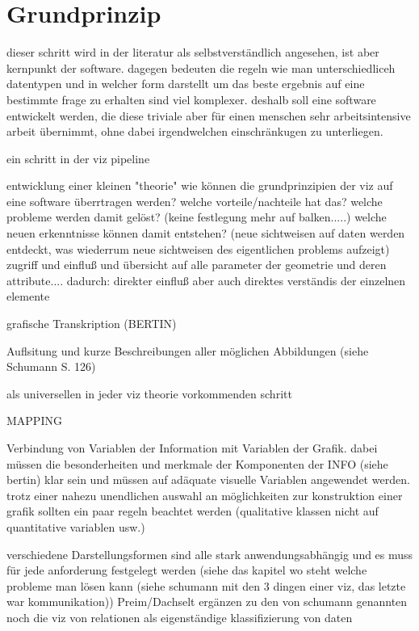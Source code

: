 \documentclass[a4paper, 12pt, DIVcalc, onepage, pdftex, headsepline, footsepline]{scrreprt}
\begin{document}
\section{Grundprinzip}
\label{sec:Grundprinzip}
dieser schritt wird in der literatur als selbstverständlich angesehen, ist aber kernpunkt der software. dagegen bedeuten die regeln wie man unterschiedliceh datentypen und in welcher form darstellt um das beste ergebnis auf eine bestimmte frage zu erhalten sind viel komplexer.
deshalb soll eine software entwickelt werden, die diese triviale aber für einen menschen sehr arbeitsintensive arbeit übernimmt, ohne dabei irgendwelchen einschränkugen zu unterliegen.

ein schritt in der viz pipeline

entwicklung einer kleinen "theorie"
wie können die grundprinzipien der viz auf eine software überrtragen werden?
welche vorteile/nachteile hat das?
welche probleme werden damit gelöst? (keine festlegung mehr auf balken.....)
welche neuen erkenntnisse können damit entstehen? (neue sichtweisen auf daten werden entdeckt, was wiederrum neue sichtweisen des eigentlichen problems aufzeigt)
zugriff und einfluß und übersicht auf alle parameter der geometrie und deren attribute....
dadurch: direkter einfluß aber auch direktes verständis der einzelnen elemente

grafische Transkription (BERTIN)

Auflsitung und kurze Beschreibungen aller möglichen Abbildungen (siehe Schumann S. 126)

als universellen in jeder viz theorie vorkommenden schritt

MAPPING

Verbindung von Variablen der Information mit Variablen der Grafik.
dabei müssen die besonderheiten und merkmale der Komponenten der INFO (siehe bertin) klar sein und müssen auf adäquate visuelle Variablen angewendet werden.
trotz einer nahezu unendlichen auswahl an möglichkeiten zur konstruktion einer grafik sollten ein paar regeln beachtet werden (qualitative klassen nicht auf quantitative variablen usw.)


verschiedene Darstellungsformen
sind alle stark anwendungsabhängig und es muss für jede anforderung festgelegt werden (siehe das kapitel wo steht welche probleme man lösen kann (siehe schumann mit den 3 dingen einer viz, das letzte war kommunikation))
Preim/Dachselt ergänzen zu den von schumann genannten noch die viz von relationen als eigenständige klassifizierung von daten
\end{document}
